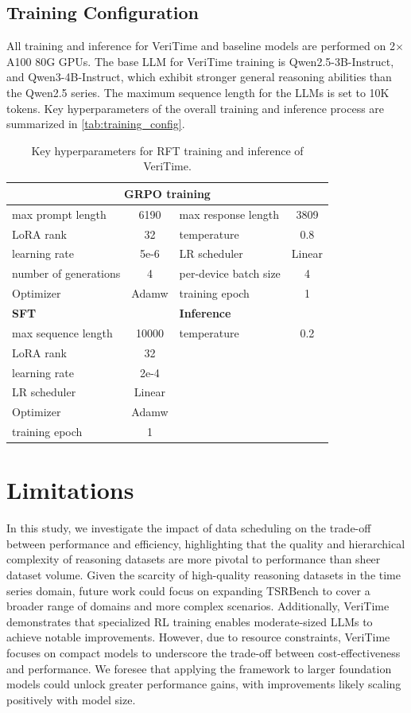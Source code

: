\documentclass{article}
\theoremstyle{plain}
\theoremstyle{definition}
\theoremstyle{remark}
\begin{document}
\subsection{Training Configuration} 
\label{abpx:training_configuration}

All training and inference for VeriTime and baseline models are performed on 2$\times$A100 80G GPUs. The base LLM for VeriTime training is Qwen2.5-3B-Instruct, and Qwen3-4B-Instruct, which exhibit stronger general reasoning abilities than the Qwen2.5 series. The maximum sequence length for the LLMs is set to 10K tokens. Key hyperparameters of the overall training and inference process are summarized in \autoref{tab:training_config}.

\begin{table}[htbp]
\centering
\caption{Key hyperparameters for RFT training and inference of VeriTime.}
\begin{tabular}{lclc}
\toprule
\multicolumn{4}{c}{\textbf{GRPO training}} \\
\midrule
max prompt length & 6190 & max response length & 3809 \\
LoRA rank & 32 & temperature & 0.8 \\
learning rate & 5e-6 & LR scheduler & Linear \\
number of generations & 4 & per-device batch size & 4 \\
Optimizer & Adamw & training epoch & 1 \\
\midrule
\textbf{SFT} & & \textbf{Inference} & \\
\midrule
max sequence length & 10000 & temperature & 0.2 \\
LoRA rank & 32 &  &  \\
learning rate & 2e-4 &  &  \\
LR scheduler & Linear &  &  \\
Optimizer & Adamw &  &  \\
training epoch & 1 &  &  \\
\bottomrule
\end{tabular}
\label{tab:training_config}
\end{table}


\section{Limitations}
\label{abpx:limitation}

In this study, we investigate the impact of data scheduling on the trade-off between performance and efficiency, highlighting that the quality and hierarchical complexity of reasoning datasets are more pivotal to performance than sheer dataset volume. Given the scarcity of high-quality reasoning datasets in the time series domain, future work could focus on expanding TSRBench to cover a broader range of domains and more complex scenarios. Additionally, VeriTime demonstrates that specialized RL training enables moderate-sized LLMs to achieve notable improvements. However, due to resource constraints, VeriTime focuses on compact models to underscore the trade-off between cost-effectiveness and performance. We foresee that applying the framework to larger foundation models could unlock greater performance gains, with improvements likely scaling positively with model size.
\end{document}
